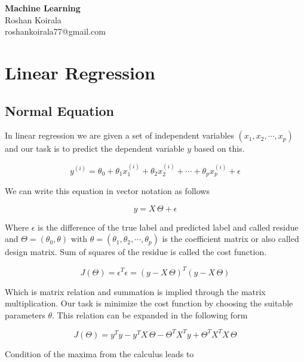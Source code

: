 \documentclass[11pt]{article}
\theoremstyle{definition}
\begin{document}
\begin{center}
{\LARGE \bf Machine Learning} \\
{Roshan Koirala} \\
{roshankoirala77@gmail.com}
\end{center}


\section{Linear Regression}

\subsection{Normal Equation}

In linear regression we are given a set of independent variables $(x_1, x_2, \cdots , x_p)$  and our task is to predict the dependent variable $y$ based on this.    

\begin{equation*}
    y^{(i)} = \theta_0 + \theta_1 x_1^{(i)} + \theta_2 x_2^{(i)} + \cdots + \theta_p x_p^{(i)} + \epsilon
\end{equation*}

We can write this equation in vector notation as follows

\begin{equation*}
    y = X \, \Theta + \epsilon
\end{equation*}

Where $\epsilon$ is the difference of the true label and predicted label and called residue and $\Theta = (\theta_0, \theta) $ with $\theta = (\theta_1, \theta_2, \cdots, \theta_p)$ is the coefficient matrix or also called design matrix. Sum of squares of the residue is called the cost function. 

\begin{equation*}
    J(\Theta) = \epsilon^T \epsilon = ({y - X\, \Theta})^T ({y - X\, \Theta})
\end{equation*}

Which is matrix relation and summation is implied through the matrix multiplication. Our task is minimize the cost function by choosing the suitable parameters $\theta$. This relation can be expanded in the following form

\begin{equation*}
    J(\Theta) = y^T y - y^T X\,\Theta - \Theta^T X^T y + \Theta^T X^T X\, \Theta
\end{equation*}

Condition of the maxima from the calculus leads to 
\end{document}
